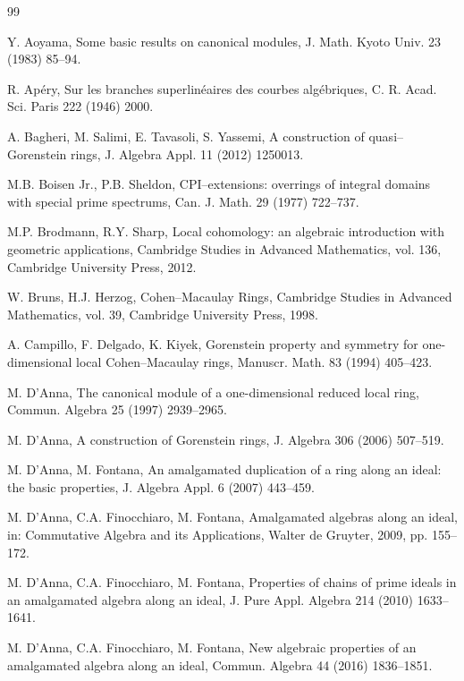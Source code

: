 \documentclass{amsart}%
\theoremstyle{plain}
\numberwithin{equation}{section}
\theoremstyle{definition}
\begin{document}
 	\begin{thebibliography}{99}

 Y. Aoyama, Some basic results on canonical modules, J. Math. Kyoto Univ. 23 (1983) 85--94.

 R. Apéry, Sur les branches superlinéaires des courbes algébriques, C. R. Acad. Sci. Paris 222 (1946) 2000.

 A. Bagheri, M. Salimi, E. Tavasoli, S. Yassemi, A construction of quasi--Gorenstein rings, J. Algebra Appl. 11 (2012) 1250013.

 M.B. Boisen Jr., P.B. Sheldon, CPI--extensions: overrings of integral domains with special prime spectrums, Can. J. Math. 29 (1977) 722--737.

 M.P. Brodmann, R.Y. Sharp, Local cohomology: an algebraic introduction with geometric applications, Cambridge Studies in Advanced Mathematics, vol. 136, Cambridge University Press, 2012.

 W. Bruns, H.J. Herzog, Cohen--Macaulay Rings, Cambridge Studies in Advanced Mathematics, vol. 39, Cambridge University Press, 1998.

 A. Campillo, F. Delgado, K. Kiyek, Gorenstein property and symmetry for one-dimensional local Cohen--Macaulay rings, Manuscr. Math. 83 (1994) 405--423.

 M. D'Anna, The canonical module of a one-dimensional reduced local ring, Commun. Algebra 25 (1997) 2939--2965.

 M. D'Anna, A construction of Gorenstein rings, J. Algebra 306 (2006) 507--519.

 M. D'Anna, M. Fontana, An amalgamated duplication of a ring along an ideal: the basic properties, J. Algebra Appl. 6 (2007) 443--459.

 M. D'Anna, C.A. Finocchiaro, M. Fontana, Amalgamated algebras along an ideal, in: Commutative Algebra and its Applications, Walter de Gruyter, 2009, pp. 155--172.

 M. D'Anna, C.A. Finocchiaro, M. Fontana, Properties of chains of prime ideals in an amalgamated algebra along an ideal, J. Pure Appl. Algebra 214 (2010) 1633--1641.

 M. D'Anna, C.A. Finocchiaro, M. Fontana, New algebraic properties of an amalgamated algebra along an ideal, Commun. Algebra 44 (2016) 1836--1851.


\end{thebibliography}
\end{document}
